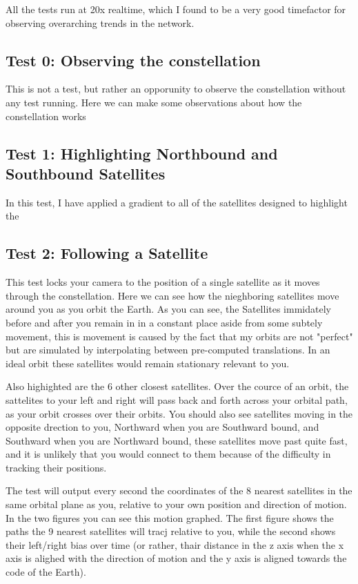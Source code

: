 \documentclass[12pt]{article}
\begin{document}
All the tests run at 20x realtime, which I found to be a very good timefactor for observing overarching trends in the network.

\subsection{Test 0: Observing the constellation}

This is not a test, but rather an opporunity to observe the constellation without any test running. Here we can make some observations about how the constellation works %

\subsection{Test 1: Highlighting Northbound and Southbound Satellites}

In this test, I have applied a gradient to all of the satellites designed to highlight the %

\subsection{Test 2: Following a Satellite}

This test locks your camera to the position of a single satellite as it moves through the constellation. Here we can see how the nieghboring satellites move around you as you orbit the Earth. As you can see, the Satellites immidately before and after you remain in in a constant place aside from some subtely movement, this is movement is caused by the fact that my orbits are not "perfect" but are simulated by interpolating between pre-computed translations. In an ideal orbit these satellites would remain stationary relevant to you.

Also highighted are the 6 other closest satellites. Over the cource of an orbit, the sattelites to your left and right will pass back and forth across your orbital path, as your orbit crosses over their orbits. You should also see satellites moving in the opposite drection to you, Northward when you are Southward bound, and Southward when you are Northward bound, these satellites move past quite fast, and it is unlikely that you would connect to them because of the difficulty in tracking their positions. \cite{OriginalReport} 

The test will output every second the coordinates of the 8 nearest satellites in the same orbital plane as you, relative to your own position and direction of motion. In the two figures you can see this motion graphed. The first figure shows the paths the 9 nearest satellites will tracj relative to you, while the second shows their left/right bias over time (or rather, thair distance in the z axis when the x axis is alighed with the direction of motion and the y axis is aligned towards the code of the Earth).
\end{document}

